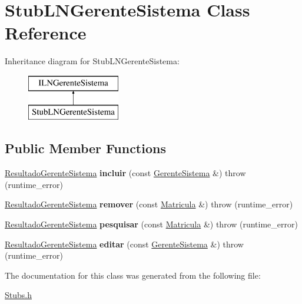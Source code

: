 \hypertarget{class_stub_l_n_gerente_sistema}{}\section{Stub\+L\+N\+Gerente\+Sistema Class Reference}
\label{class_stub_l_n_gerente_sistema}
Inheritance diagram for Stub\+L\+N\+Gerente\+Sistema\+:\begin{figure}[H]
\begin{center}
\leavevmode
\includegraphics[height=2.000000cm]{class_stub_l_n_gerente_sistema}
\end{center}
\end{figure}
\subsection*{Public Member Functions}
\begin{DoxyCompactItemize}
\item 
\hypertarget{class_stub_l_n_gerente_sistema_ae15fe8bc3171fa9ba4f3d64ba2ea55b5}{}\label{class_stub_l_n_gerente_sistema_ae15fe8bc3171fa9ba4f3d64ba2ea55b5} 
\hyperlink{class_resultado_gerente_sistema}{Resultado\+Gerente\+Sistema} {\bfseries incluir} (const \hyperlink{class_gerente_sistema}{Gerente\+Sistema} \&)  throw (runtime\+\_\+error)
\item 
\hypertarget{class_stub_l_n_gerente_sistema_ab47881f2957822719484bf644188c4d7}{}\label{class_stub_l_n_gerente_sistema_ab47881f2957822719484bf644188c4d7} 
\hyperlink{class_resultado_gerente_sistema}{Resultado\+Gerente\+Sistema} {\bfseries remover} (const \hyperlink{class_matricula}{Matricula} \&)  throw (runtime\+\_\+error)
\item 
\hypertarget{class_stub_l_n_gerente_sistema_a46b09796c8f560fee66491a2b1b0b52b}{}\label{class_stub_l_n_gerente_sistema_a46b09796c8f560fee66491a2b1b0b52b} 
\hyperlink{class_resultado_gerente_sistema}{Resultado\+Gerente\+Sistema} {\bfseries pesquisar} (const \hyperlink{class_matricula}{Matricula} \&)  throw (runtime\+\_\+error)
\item 
\hypertarget{class_stub_l_n_gerente_sistema_ae42d596e2be82d27d06b2024dba1fb0d}{}\label{class_stub_l_n_gerente_sistema_ae42d596e2be82d27d06b2024dba1fb0d} 
\hyperlink{class_resultado_gerente_sistema}{Resultado\+Gerente\+Sistema} {\bfseries editar} (const \hyperlink{class_gerente_sistema}{Gerente\+Sistema} \&)  throw (runtime\+\_\+error)
\end{DoxyCompactItemize}


The documentation for this class was generated from the following file\+:\begin{DoxyCompactItemize}
\item 
\hyperlink{_stubs_8h}{Stubs.\+h}\end{DoxyCompactItemize}
